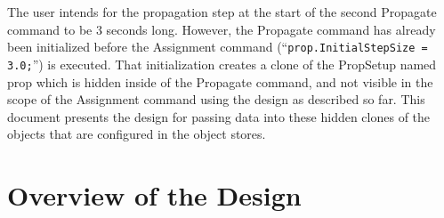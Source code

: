 \documentclass[10pt,letterpaper]{article}
\begin{document}
\noindent The user intends for the propagation step at the start of the second Propagate command to be 3 seconds long.  However, the Propagate command has already been initialized before the Assignment command (``\texttt{prop.InitialStepSize = 3.0;}'') is executed.  That initialization creates a clone of the PropSetup named prop which is hidden inside of the Propagate command, and not visible in the scope of the Assignment command using the design as described so far.  This document presents the design for passing data into these hidden clones of the objects that are configured in the object stores.

\section{Overview of the Design}
\end{document}
